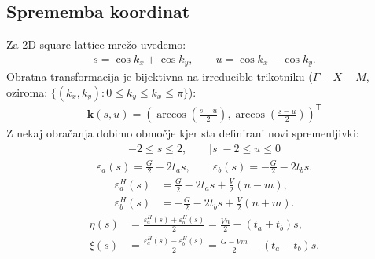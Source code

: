\documentclass[a4paper,10pt]{article}
\renewcommand{\vec}[1]{\mathbf{#1}}
\begin{document}
\subsection{Sprememba koordinat} 
Za 2D square lattice mrežo uvedemo: 
\begin{align}
s=\cos k_x+\cos k_y,\qquad
u=\cos k_x-\cos k_y.
\end{align}
Obratna transformacija je bijektivna na irreducible trikotniku ($\Gamma -X-M$, oziroma: $\{(k_x,k_y):0\leq k_y\leq k_x\leq\pi\}$):
\begin{align}
  \vec{k}(s,u) = \left(\arccos\!\left(\frac{s+u}{2}\right), \arccos\!\left(\frac{s-u}{2}\right)\right)^\mathsf{T}
\end{align}
Z nekaj obračanja dobimo območje kjer sta definirani novi spremenljivki: 
\begin{align}
-2\leq s\leq2,\qquad |s|-2\leq u\leq0
\end{align}
\begin{align}
\varepsilon_a(s)=\frac G2-2t_a s,\qquad
\varepsilon_b(s)=-\frac G2-2t_b s.
\end{align}
\begin{align}
\varepsilon_a^H(s)
&=\frac G2-2t_a s+\frac V2(n-m),\\
\varepsilon_b^H(s)
&=-\frac G2-2t_b s+\frac V2(n+m).
\end{align}
\begin{align}
\eta(s)
&=\frac{\varepsilon_a^H(s)+\varepsilon_b^H(s)}2
=\frac{Vn}{2}-(t_a+t_b)s,\\
\xi(s)
&=\frac{\varepsilon_a^H(s)-\varepsilon_b^H(s)}2
=\frac{G-Vm}{2}-(t_a-t_b)s.
\end{align}
\end{document}
